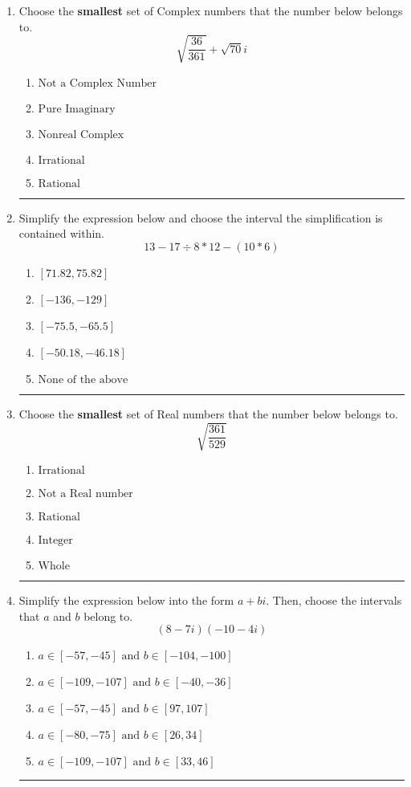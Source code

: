 \documentclass[14pt]{extbook}
\newcommand{\litem}[1]{\item#1\hspace*{-1cm}\rule{\textwidth}{0.4pt}}
\begin{document}
\begin{enumerate}
\litem{
Choose the \textbf{smallest} set of Complex numbers that the number below belongs to.\[ \sqrt{\frac{36}{361}}+\sqrt{70} i \]\begin{enumerate}[label=\Alph*.]
\item \( \text{Not a Complex Number} \)
\item \( \text{Pure Imaginary} \)
\item \( \text{Nonreal Complex} \)
\item \( \text{Irrational} \)
\item \( \text{Rational} \)

\end{enumerate} }
\litem{
Simplify the expression below and choose the interval the simplification is contained within.\[ 13 - 17 \div 8 * 12 - (10 * 6) \]\begin{enumerate}[label=\Alph*.]
\item \( [71.82, 75.82] \)
\item \( [-136, -129] \)
\item \( [-75.5, -65.5] \)
\item \( [-50.18, -46.18] \)
\item \( \text{None of the above} \)

\end{enumerate} }
\litem{
Choose the \textbf{smallest} set of Real numbers that the number below belongs to.\[ \sqrt{\frac{361}{529}} \]\begin{enumerate}[label=\Alph*.]
\item \( \text{Irrational} \)
\item \( \text{Not a Real number} \)
\item \( \text{Rational} \)
\item \( \text{Integer} \)
\item \( \text{Whole} \)

\end{enumerate} }
\litem{
Simplify the expression below into the form $a+bi$. Then, choose the intervals that $a$ and $b$ belong to.\[ (8 - 7 i)(-10 - 4 i) \]\begin{enumerate}[label=\Alph*.]
\item \( a \in [-57, -45] \text{ and } b \in [-104, -100] \)
\item \( a \in [-109, -107] \text{ and } b \in [-40, -36] \)
\item \( a \in [-57, -45] \text{ and } b \in [97, 107] \)
\item \( a \in [-80, -75] \text{ and } b \in [26, 34] \)
\item \( a \in [-109, -107] \text{ and } b \in [33, 46] \)


\end{enumerate}}
\end{enumerate}
\end{document}
